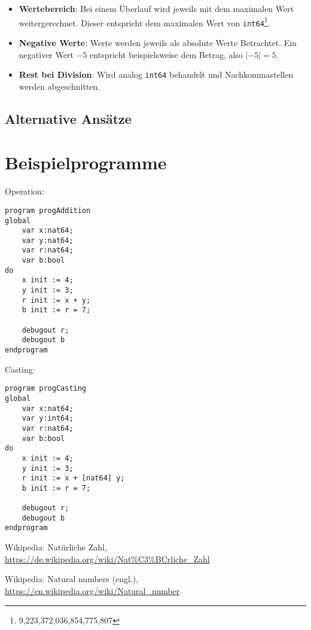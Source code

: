 \documentclass[10pt, a4paper, twocolumn]{article} %
\begin{document}
\begin{itemize} %
    \item \textbf{Wertebereich}: Bei einem Überlauf wird jeweils mit dem maximalen Wert weitergerechnet. Dieser entspricht dem maximalen Wert von \texttt{int64}\footnote{9,223,372,036,854,775,807}.
    \item \textbf{Negative Werte}: Werte werden jeweils als absolute Werte Betrachtet. Ein negativer Wert $-5$ entspricht beispielsweise dem Betrag, also $|-5| = 5$.
    \item \textbf{Rest bei Division}: Wird analog \texttt{int64} behandelt und Nachkommastellen werden abgeschnitten.
\end{itemize}

\subsection{Alternative Ansätze}


\section{Beispielprogramme}
\label{sec:prog}
Operation:
\begin{lstlisting}
program progAddition
global
    var x:nat64;
    var y:nat64;
    var r:nat64;
    var b:bool
do
    x init := 4;
    y init := 3;
    r init := x + y;
    b init := r = 7;

    debugout r;
    debugout b
endprogram
\end{lstlisting}
Casting:
\begin{lstlisting}
program progCasting
global
    var x:nat64;
    var y:int64;
    var r:nat64;
    var b:bool
do
    x init := 4;
    y init := 3;
    r init := x + [nat64] y;
    b init := r = 7;

    debugout r;
    debugout b
endprogram
\end{lstlisting}


\begin{thebibliography}{9}
	Wikipedia: Natürliche Zahl,
	\url{https://de.wikipedia.org/wiki/Nat\%C3\%BCrliche_Zahl}

    Wikipedia: Natural numbers (engl.),
    \url{https://en.wikipedia.org/wiki/Natural_number}


\end{thebibliography}
\end{document}
